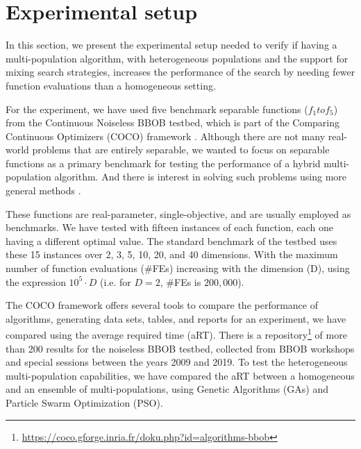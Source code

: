 \documentclass[runningheads]{llncs}
\begin{document}
\section{Experimental setup}
\label{setup}

In this section, we present the experimental setup needed 
to verify if having a multi-population algorithm, with
heterogeneous populations and the support for mixing search strategies,
increases the performance of the search by needing fewer function evaluations
than a homogeneous setting.

For the experiment, we have used five
benchmark separable functions ($f_1 to f_5 $) from the Continuous Noiseless
BBOB testbed, which is part of the Comparing Continuous Optimizers (COCO)
framework \cite{hansen2016coco}. Although there are not many real-world
problems that are entirely separable, we wanted to focus on separable functions
as a primary benchmark for testing the performance of a hybrid multi-population
algorithm. And there is interest in solving such problems using more
general methods \cite{doerr2013evolutionary,swarzberg1994step}. %

These functions are real-parameter, single-objective, and are
usually employed as benchmarks. We have tested with fifteen instances of each
function, each one having a different optimal value. The standard benchmark of
the testbed %
uses these 15 instances over 2, 3, 5, 10, 20, and
40 dimensions. With the maximum number of function evaluations (\#FEs)
increasing with the dimension (D), using the expression $10^5 \cdot D$ (i.e.
for $D = 2$, \#FEs is $200,000$).

The COCO framework offers several tools to compare the performance of
algorithms, generating data sets, tables, and reports for an experiment, we have
compared using the average required time (aRT). There is a
repository\footnote{\url{https://coco.gforge.inria.fr/doku.php?id=algorithms-bbob}}
of more than 200 results for the noiseless BBOB testbed, collected from BBOB
workshops and special sessions between the years 2009 and 2019. To test the
heterogeneous multi-population capabilities, we have compared the aRT between a
homogeneous and an ensemble of multi-populations, using Genetic Algorithms
(GAs) and Particle Swarm Optimization (PSO).
\end{document}
